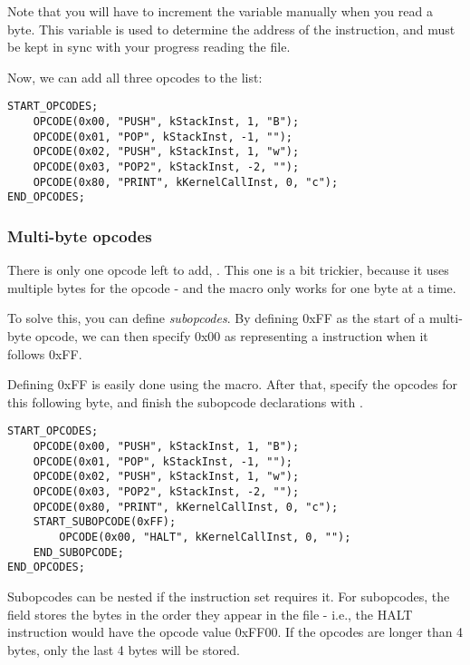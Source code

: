Note that you will have to increment the  variable manually when you read a byte. This variable is used to determine the address of the instruction, and must be kept in sync with your progress reading the file.

Now, we can add all three opcodes to the list:

\begin{C++}
\begin{lstlisting}
START_OPCODES;
	OPCODE(0x00, "PUSH", kStackInst, 1, "B");
	OPCODE(0x01, "POP", kStackInst, -1, "");
	OPCODE(0x02, "PUSH", kStackInst, 1, "w");
	OPCODE(0x03, "POP2", kStackInst, -2, "");
	OPCODE(0x80, "PRINT", kKernelCallInst, 0, "c");
END_OPCODES;
\end{lstlisting}
\end{C++}

\subsubsection{Multi-byte opcodes}
There is only one opcode left to add, . This one is a bit trickier, because it uses multiple bytes for the opcode - and the  macro only works for one byte at a time.

To solve this, you can define \emph{subopcodes}. By defining 0xFF as the start of a multi-byte opcode, we can then specify 0x00 as representing a  instruction when it follows 0xFF.

Defining 0xFF is easily done using the  macro. After that, specify the opcodes for this following byte, and finish the subopcode declarations with .

\begin{C++}
\begin{lstlisting}
START_OPCODES;
	OPCODE(0x00, "PUSH", kStackInst, 1, "B");
	OPCODE(0x01, "POP", kStackInst, -1, "");
	OPCODE(0x02, "PUSH", kStackInst, 1, "w");
	OPCODE(0x03, "POP2", kStackInst, -2, "");
	OPCODE(0x80, "PRINT", kKernelCallInst, 0, "c");
	START_SUBOPCODE(0xFF);
		OPCODE(0x00, "HALT", kKernelCallInst, 0, "");
	END_SUBOPCODE;
END_OPCODES;
\end{lstlisting}
\end{C++}

Subopcodes can be nested if the instruction set requires it. For subopcodes, the  field stores the bytes in the order they appear in the file - i.e., the HALT instruction would have the opcode value 0xFF00. If the opcodes are longer than 4 bytes, only the last 4 bytes will be stored.

